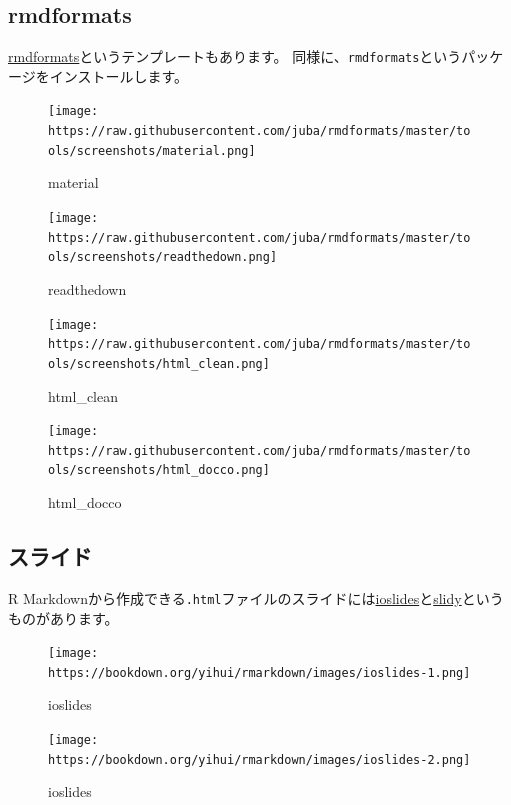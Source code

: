 \documentclass[]{bxjsreport}
\let\asdf\section
\renewcommand{\section}{\chapter}
\let\asdff\subsection
\renewcommand{\subsection}{\asdf}
\renewcommand{\subsubsection}{\asdff}
\begin{document}
\hypertarget{rmdformats}{%
\subsubsection{rmdformats}\label{rmdformats}}

\href{https://github.com/juba/rmdformats}{rmdformats}というテンプレートもあります。
同様に、\texttt{rmdformats}というパッケージをインストールします。

\begin{figure}
\centering
\texttt{[image: https://raw.githubusercontent.com/juba/rmdformats/master/tools/screenshots/material.png]}
\caption{material}
\end{figure}

\begin{figure}
\centering
\texttt{[image: https://raw.githubusercontent.com/juba/rmdformats/master/tools/screenshots/readthedown.png]}
\caption{readthedown}
\end{figure}

\begin{figure}
\centering
\texttt{[image: https://raw.githubusercontent.com/juba/rmdformats/master/tools/screenshots/html\_clean.png]}
\caption{html\_clean}
\end{figure}

\begin{figure}
\centering
\texttt{[image: https://raw.githubusercontent.com/juba/rmdformats/master/tools/screenshots/html\_docco.png]}
\caption{html\_docco}
\end{figure}

\hypertarget{ux30b9ux30e9ux30a4ux30c9}{%
\subsubsection{スライド}\label{ux30b9ux30e9ux30a4ux30c9}}

R Markdownから作成できる\texttt{.html}ファイルのスライドには\href{https://bookdown.org/yihui/rmarkdown/ioslides-presentation.html}{ioslides}と\href{https://bookdown.org/yihui/rmarkdown/slidy-presentation.html}{slidy}というものがあります。

\begin{figure}
\centering
\texttt{[image: https://bookdown.org/yihui/rmarkdown/images/ioslides-1.png]}
\caption{ioslides}
\end{figure}

\begin{figure}
\centering
\texttt{[image: https://bookdown.org/yihui/rmarkdown/images/ioslides-2.png]}
\caption{ioslides}
\end{figure}
\end{document}
